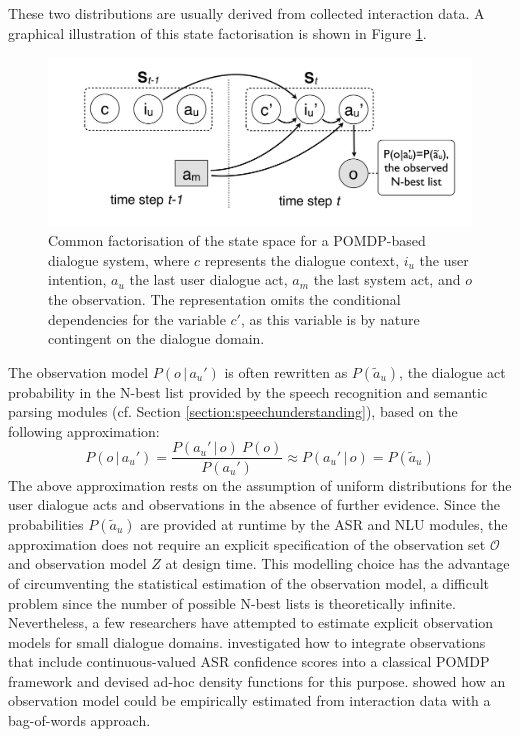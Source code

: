 These two distributions are usually derived from collected interaction data. A graphical illustration of this state factorisation is shown in Figure \ref{fig:pomdp2}. 

\begin{figure}[ht]
\centering
\includegraphics[scale=0.28]{imgs/POMDP2.pdf}
\caption{Common factorisation of the state space for a POMDP-based dialogue system, where $c$ represents the dialogue context, $i_u$ the user intention, $a_u$ the last user dialogue act, $a_m$ the last system act, and $o$ the observation. The representation omits the conditional dependencies  for the variable $c'$, as this variable is by nature contingent on the dialogue domain.}
\label{fig:pomdp2}
\end{figure}

The observation model $P(o \, | \, a_u')$ is often rewritten as $P(\tilde{a}_u)$, the dialogue act probability in the N-best list provided by the speech recognition and semantic parsing modules (cf. Section \ref{section:speechunderstanding}), based on the following approximation:
\begin{equation}
P(o \, | \, a_u') = \frac{P(a_u' \, | \, o) \ P(o)} {P(a_u')} \approx P(a_u' \, | \, o) = P(\tilde{a}_u)
\end{equation}
The above approximation rests on the assumption of uniform distributions for the user dialogue acts and observations in the absence of further evidence. Since the probabilities $P(\tilde{a}_u)$ are provided at runtime by the ASR and NLU modules, the approximation does not require an explicit specification of the observation set $\mathcal{O}$ and observation model $Z$ at design time.  This modelling choice has the advantage of circumventing the statistical estimation of the observation model, a difficult problem since the number of possible N-best lists is theoretically infinite. Nevertheless, a few researchers have attempted to estimate explicit observation models for small dialogue domains. \cite{Williamsetal:2008} investigated how to integrate observations that include continuous-valued ASR confidence scores into a classical POMDP framework and devised ad-hoc density functions for this purpose.  \cite{chinaei2012} showed how an observation model could be empirically estimated from interaction data with a bag-of-words approach. 

